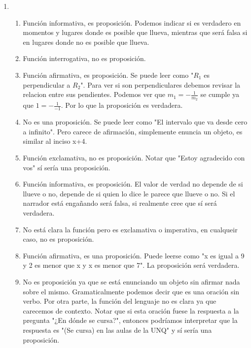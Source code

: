 \documentclass[a4paper]{article}
\newcommand{\exercise}{\item}
\begin{document}
\begin{enumerate}
\begin{enumerate} [label=(\alph*)]
		\item Razonamiento válido. \href{https://youtu.be/PtjWjkc5txI}{Resolución por Maria Alicia Piñeiro}.
		\item Razonamiento válido. \href{https://youtu.be/PtjWjkc5txI?t=328}{Ejercicio parecido por Maria Alicia Piñeiro}.
		\item Razonamiento inválido. Se puede demostrar por contraejemplo: asumiendo que todos los dulces tienen carbohidratos y que hay comidas sin carbohidratos y proteínas, aun puede suceder que no todas las comidas tengan carbohidratos o proteínas, como es el caso de la manteca. \href{https://youtu.be/AMDgepP_N_A?t=892}{Ejercicio parecido por Jonathan Castro}.
\end{enumerate}\exercise\begin{enumerate} [label=(\alph*)]		\item Función informativa, es proposición. Podemos indicar si es verdadero en momentos y lugares donde es posible que llueva, mientras que será falsa si en lugares donde no es posible que llueva.
		\item Función interrogativa, no es proposición.
		\item Función afirmativa, es proposición. Se puede leer como "$R_1$ es perpendicular a $R_2$". Para ver si son perpendiculares debemos revisar la relacion entre sus pendientes. Podemos ver que $m_1 = -\frac{1}{m_2}$ se cumple ya que $1 = -\frac{1}{-1}$. Por lo que la proposición es verdadera.
		\item No es una proposición. Se puede leer como "El intervalo que va desde cero a infinito". Pero carece de afirmación, simplemente enuncia un objeto, es similar al inciso x+4.
		\item Función exclamativa, no es proposición. Notar que "Estoy agradecido con vos" sí sería una proposición.
		\item Función informativa, es proposición. El valor de verdad no depende de si llueve o no, depende de si quien lo dice le parece que llueve o no. Si el narrador está engañando será falsa, si realmente cree que sí será verdadera.
		\item No está clara la función pero es exclamativa o imperativa, en cualqueir caso, no es proposición.
		\item Función afirmativa, es una proposición. Puede leerse como "x es igual a 9 y 2 es menor que x y x es menor que 7". La proposición será verdadera.
		\item No es proposición ya que se está enunciando un objeto sin afirmar nada sobre el mismo. Gramaticalmente podemos decir que es una oración sin verbo. Por otra parte, la función del lenguaje no es clara ya que carecemos de contexto. Notar que si esta oración fuese la respuesta a la pregunta "¿En dónde se cursa?", entonces podríamos interpretar que la respuesta es "(Se cursa) en las aulas de la UNQ" y sí sería una proposición.

\end{enumerate}
\end{enumerate}
\end{document}
